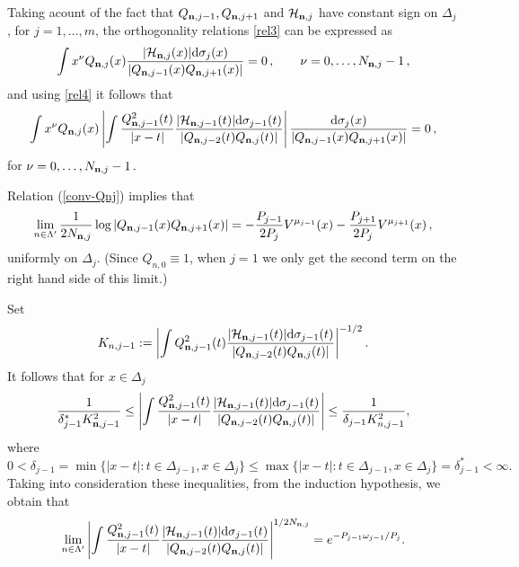 \documentclass{amsart}
\theoremstyle{definition}
\theoremstyle{remark}
\begin{document}
\medskip

Taking acount of the fact that $Q_{{\bf n},j-1},Q_{{\bf n},j+1}$  and $\mathcal{H}_{{\bf n},j}$ have constant sign on $\Delta_j$, for $j=1,\ldots, m$, the orthogonality relations  \eqref{rel3} can be expressed as
\[ \int x^{\nu} Q_{{\bf n},j}(x)  \frac{|\mathcal{H}_{{\bf n},j}(x)| {\rm d}\sigma_j(x)}{|Q_{{\bf n},j-1}(x)Q_{{\bf
n},j+1}(x)|} = 0\,, \qquad \nu=0,\ldots,N_{{\bf n},j}-1\,,
\]
and using \eqref{rel4} it follows that
\[ \int x^{\nu} Q_{{\bf n},j}(x) \left| \int \frac{Q_{{\bf n},j-1}^2(t)}{|x-t|} \frac{|\mathcal{H}_{{\bf n},j-1}(t)|{\rm d}\sigma_{j-1}(t)}{ |Q_{{\bf n},j-2}(t)Q_{{\bf n},j}(t)| }\right|\frac{{\rm d}\sigma_j(x)}{|Q_{{\bf n},j-1}(x)Q_{{\bf n},j+1}(x)|} = 0\,,
\]
for $\nu=0,\ldots,N_{{\bf n},j}-1\,.$

\medskip

Relation (\ref{conv-Qnj}) implies that
\begin{equation}\label{eq:5}
\lim_{n \in \Lambda'} \frac{1}{2N_{{\bf n},j}}\log|Q_{{\bf n},j-1}(x)Q_{{\bf n},j+1}(x)| = -
\frac{P_{j-1}}{2 P_j}V^{\mu_{j-1}}(x) -
\frac{P_{j+1}}{2 P_j}V^{\mu_{j+1}}(x)\,,
\end{equation}
uniformly on $\Delta_j.$ (Since $Q_{n,0}\equiv 1$, when
$j=1$ we only get the second term on the right hand side of
this limit.)

\medskip

Set
\begin{equation} \label{Knj} K_{n,j-1} := \left|\int  {Q_{{\bf n},j-1}^2(t)}  \frac{ |{\mathcal{H}}_{{\bf n},j-1}(t)|{\rm d}\sigma_{j-1}(t)}{|Q_{{\bf n},j-2}(t)Q_{{\bf n},j}(t)|}
 \right|^{-1/2}.
\end{equation}
It follows that for $x \in \Delta_j$
\[ \frac{1}{\delta_{j-1}^*K_{{\bf n},j-1}^2} \leq \left|\int \frac{Q_{{\bf n},j-1}^2(t)}{|x-t|}\frac{ |{\mathcal{H}}_{{\bf n},j-1}(t)|{\rm d}\sigma_{j-1}(t)}{|Q_{{\bf n},j-2}(t)Q_{{\bf n},j}(t)|}
\right|\leq \frac{1}{\delta_{j-1}K_{n,j-1}^2},
\]
where $0 < \delta_{j-1} = \min\{|x-t|: t \in \Delta_{j-1}, x \in
\Delta_j\} \leq \max\{|x-t|: t \in \Delta_{j-1}, x \in \Delta_j\}
= \delta_{j-1}^* < \infty.$ Taking into consideration these
inequalities, from the induction hypothesis, we obtain that
\begin{equation} \label{eq:6}
\lim_{n \in \Lambda'} \left|\int \frac{Q_{{\bf n},j-1}^2(t)}{|x-t|}\frac{ |{\mathcal{H}}_{{\bf n},j-1}(t)|{\rm d}\sigma_{j-1}(t)}{|Q_{{\bf n},j-2}(t)Q_{{\bf n},j}(t)|}\right|^{1/2N_{{\bf n},j}} = e^{- P_{j-1}\omega_{j-1}/P_j }.
\end{equation}
\end{document}
